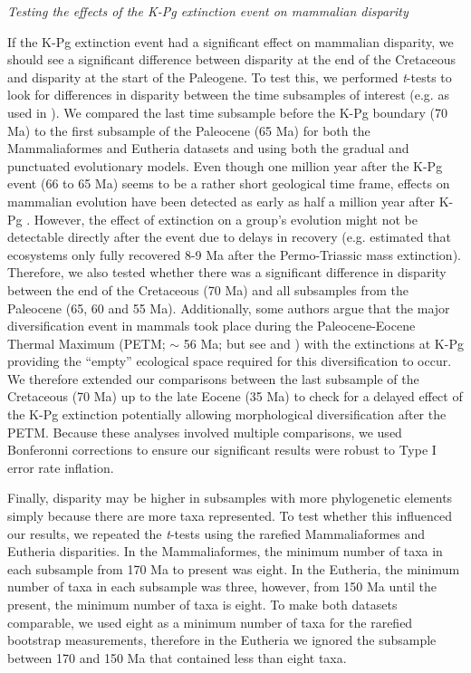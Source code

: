 \documentclass[12pt,letterpaper]{article}
\renewcommand{\subsection}[1]{%
\bigskip
\begin{center}
\begin{large}
\normalfont\itshape #1
\end{large}
\end{center}}
\begin{document}
\subsection{Testing the effects of the K-Pg extinction event on mammalian disparity}
If the K-Pg extinction event had a significant effect on mammalian disparity, we should see a significant difference between disparity at the end of the Cretaceous and disparity at the start of the Paleogene.
To test this, we performed \textit{t}-tests to look for differences in disparity between the time subsamples of interest (e.g. as used in \cite{anderson2012using,zelditch2012geometric,smith2014joined}).
We compared the last time subsample before the K-Pg boundary (70 Ma) to the first subsample of the Paleocene (65 Ma) for both the Mammaliaformes and Eutheria datasets and using both the gradual and punctuated evolutionary models.
Even though one million year after the K-Pg event (66 to 65 Ma) seems to be a rather short geological time frame, effects on mammalian evolution have been detected as early as half a million year after K-Pg \cite{Wilson2013}.
However, the effect of extinction on a group's evolution might not be detectable directly after the event due to delays in recovery (e.g. \cite{chen2012timing} estimated that ecosystems only fully recovered 8-9 Ma after the Permo-Triassic mass extinction).
Therefore, we also tested whether there was a significant difference in disparity between the end of the Cretaceous (70 Ma) and all subsamples from the Paleocene (65, 60 and 55 Ma).
Additionally, some authors argue that the major diversification event in mammals took place during the Paleocene-Eocene Thermal Maximum (PETM; $\sim$ 56 Ma; \cite{bininda2007delayed} but see \cite{meredithimpacts2011} and \cite{Stadler12042011}) with the extinctions at K-Pg providing the ``empty'' ecological space required for this diversification to occur.
We therefore extended our comparisons between the last subsample of the Cretaceous (70 Ma) up to the late Eocene (35 Ma) to check for a delayed effect of the K-Pg extinction potentially allowing morphological diversification after the PETM. 
Because these analyses involved multiple comparisons, we used Bonferonni corrections \cite{holm1979simple} to ensure our significant results were robust to Type I error rate inflation. 

Finally, disparity may be higher in subsamples with more phylogenetic elements simply because there are more taxa represented.
To test whether this influenced our results, we repeated the \textit{t}-tests using the rarefied Mammaliaformes and Eutheria disparities.
In the Mammaliaformes, the minimum number of taxa in each subsample from 170 Ma to present was eight.
In the Eutheria, the minimum number of taxa in each subsample was three, however, from 150 Ma until the present, the minimum number of taxa is eight.
To make both datasets comparable, we used eight as a minimum number of taxa for the rarefied bootstrap measurements, therefore in the Eutheria we ignored the subsample between 170 and 150 Ma that contained less than eight taxa.
\end{document}
